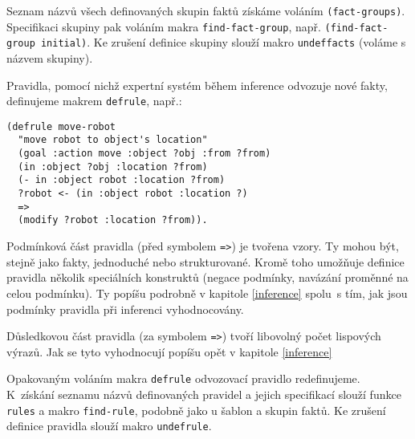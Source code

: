 Seznam názvů všech definovaných skupin faktů získáme voláním
\verb|(fact-groups)|. Specifikaci skupiny pak voláním makra
\verb|find-fact-group|, např. \verb|(find-fact-group initial)|. Ke zrušení
definice skupiny slouží makro \verb|undeffacts| (voláme s názvem skupiny).

Pravidla, pomocí nichž expertní systém během inference odvozuje nové fakty,
definujeme makrem
\verb|defrule|, např.:
\begin{verbatim}
(defrule move-robot
  "move robot to object's location"
  (goal :action move :object ?obj :from ?from)
  (in :object ?obj :location ?from)
  (- in :object robot :location ?from)
  ?robot <- (in :object robot :location ?)
  =>
  (modify ?robot :location ?from)).
\end{verbatim}
Podmínková část pravidla (před symbolem \verb|=>|) je tvořena vzory. Ty mohou
být, stejně jako fakty, jednoduché nebo strukturované. Kromě toho umožňuje
definice pravidla několik speciálních konstruktů (negace podmínky, navázání
proměnné na celou podmínku). Ty popíšu podrobně v kapitole \ref{inference} spolu~s
tím, jak jsou podmínky pravidla při inferenci vyhodnocovány.

\FloatBarrier

Důsledkovou část pravidla (za symbolem \verb|=>|) tvoří libovolný počet
lispových výrazů. Jak se tyto vyhodnocují popíšu opět v kapitole \ref{inference}

Opakovaným voláním makra \verb|defrule| odvozovací pravidlo redefinujeme.
K~získání seznamu názvů definovaných pravidel a jejich specifikací slouží
funkce \verb|rules| a makro \verb|find-rule|, podobně jako u šablon a
skupin faktů.  Ke zrušení definice pravidla slouží makro \verb|undefrule|.
